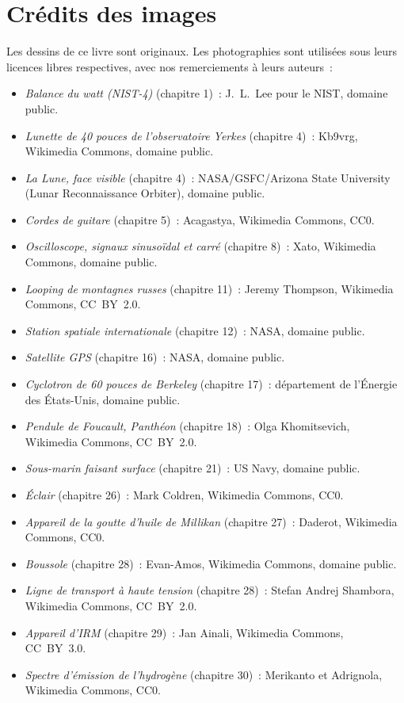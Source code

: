 \chapter*{Crédits des images}

Les dessins de ce livre sont originaux. Les photographies sont
utilisées sous leurs licences libres respectives, avec nos
remerciements à leurs auteurs~:

\begin{itemize}
  \item \emph{Balance du watt (NIST-4)} (chapitre 1)~: J.~L.~Lee pour
        le NIST, domaine public.
  \item \emph{Lunette de 40 pouces de l'observatoire Yerkes}
        (chapitre 4)~: Kb9vrg, Wikimedia Commons, domaine public.
  \item \emph{La Lune, face visible} (chapitre 4)~:
        NASA/GSFC/Arizona State University (Lunar Reconnaissance
        Orbiter), domaine public.
  \item \emph{Cordes de guitare} (chapitre 5)~: Acagastya, Wikimedia
        Commons, CC0.
  \item \emph{Oscilloscope, signaux sinusoïdal et carré}
        (chapitre 8)~: Xato, Wikimedia Commons, domaine public.
  \item \emph{Looping de montagnes russes} (chapitre 11)~: Jeremy
        Thompson, Wikimedia Commons, CC~BY~2.0.
  \item \emph{Station spatiale internationale} (chapitre 12)~: NASA,
        domaine public.
  \item \emph{Satellite GPS} (chapitre 16)~: NASA, domaine public.
  \item \emph{Cyclotron de 60 pouces de Berkeley} (chapitre 17)~:
        département de l'Énergie des États-Unis, domaine public.
  \item \emph{Pendule de Foucault, Panthéon} (chapitre 18)~: Olga
        Khomitsevich, Wikimedia Commons, CC~BY~2.0.
  \item \emph{Sous-marin faisant surface} (chapitre 21)~: US Navy,
        domaine public.
  \item \emph{Éclair} (chapitre 26)~: Mark Coldren, Wikimedia
        Commons, CC0.
  \item \emph{Appareil de la goutte d'huile de Millikan}
        (chapitre 27)~: Daderot, Wikimedia Commons, CC0.
  \item \emph{Boussole} (chapitre 28)~: Evan-Amos, Wikimedia Commons,
        domaine public.
  \item \emph{Ligne de transport à haute tension} (chapitre 28)~:
        Stefan Andrej Shambora, Wikimedia Commons, CC~BY~2.0.
  \item \emph{Appareil d'IRM} (chapitre 29)~: Jan Ainali, Wikimedia
        Commons, CC~BY~3.0.
  \item \emph{Spectre d'émission de l'hydrogène} (chapitre 30)~:
        Merikanto et Adrignola, Wikimedia Commons, CC0.
\end{itemize}

